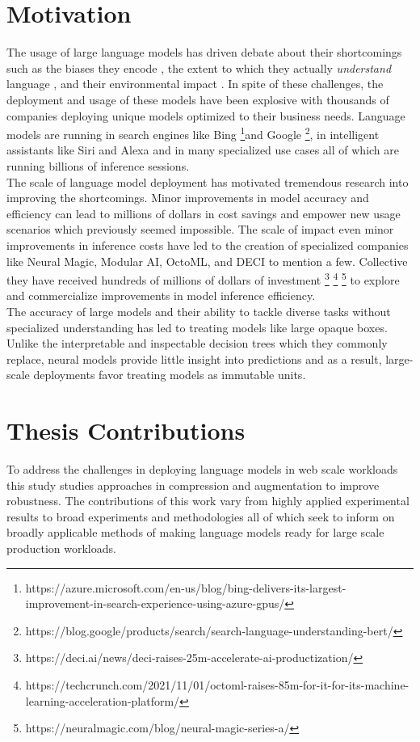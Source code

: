 \section{Motivation}
The usage of large language models has driven debate about their shortcomings such as the biases they encode \cite{Nadeem2021StereoSetMS} \cite{Bender2021OnTD}, the extent to which they actually \textit{understand} language \cite{Petroni2019LanguageMA} \cite{Jiang2020HowCW}, and their environmental impact \cite{Strubell2020EnergyAP} \cite{Strubell2019EnergyAP}. In spite of these challenges, the deployment and usage of these models have been explosive with thousands of companies deploying unique models optimized to their business needs. Language models are running in search engines like Bing \footnote{https://azure.microsoft.com/en-us/blog/bing-delivers-its-largest-improvement-in-search-experience-using-azure-gpus/}and Google \footnote{https://blog.google/products/search/search-language-understanding-bert/}, in intelligent assistants like Siri and Alexa \cite{FitzGerald2022AlexaTM} and in many specialized use cases all of which are running billions of inference sessions. \\
The scale of language model deployment has motivated tremendous research into improving the shortcomings. Minor improvements in model accuracy and efficiency can lead to millions of dollars in cost savings and empower new usage scenarios which previously seemed impossible. The scale of impact even minor improvements in inference costs have led to the creation of specialized companies like Neural Magic, Modular AI, OctoML, and DECI to mention a few. Collective they have received hundreds of millions of dollars of investment \footnote{https://deci.ai/news/deci-raises-25m-accelerate-ai-productization/} \footnote{https://techcrunch.com/2021/11/01/octoml-raises-85m-for-it-for-its-machine-learning-acceleration-platform/} \footnote{https://neuralmagic.com/blog/neural-magic-series-a/} to explore and commercialize improvements in model inference efficiency. \\ 
The accuracy of large models and their ability to tackle diverse tasks without specialized understanding has led to treating models like large opaque boxes. Unlike the interpretable and inspectable decision trees which they commonly replace, neural models provide little insight into predictions and as a result, large-scale deployments favor treating models as immutable units. 
\section{Thesis Contributions}
To address the challenges in deploying language models in web scale workloads this study studies approaches in compression and augmentation to improve robustness. The contributions of this work vary from highly applied experimental results to broad experiments and methodologies all of which seek to inform on broadly applicable methods of making language models ready for large scale production workloads. 

